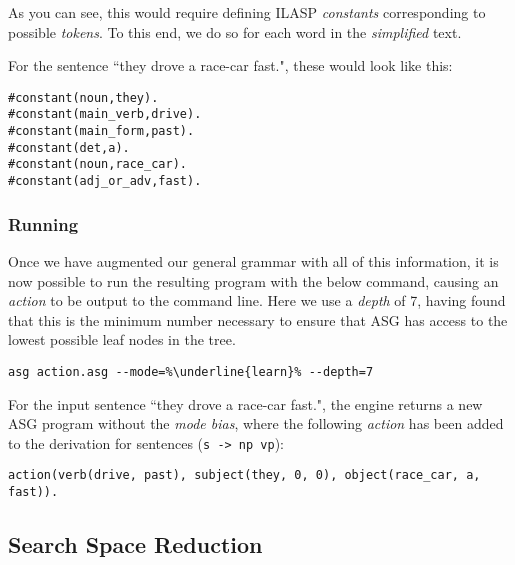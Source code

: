 As you can see, this would require defining ILASP \textit{constants} corresponding to possible \textit{tokens}. To this end, we do so for each word in the \textit{simplified} text.

For the sentence ``they drove a race-car fast.", these would look like this:

\begin{displayquote}
\begin{lstlisting}
#constant(noun,they).
#constant(main_verb,drive).
#constant(main_form,past).
#constant(det,a).
#constant(noun,race_car).
#constant(adj_or_adv,fast).
\end{lstlisting}
\end{displayquote}

\subsubsection{Running}

Once we have augmented our general grammar with all of this information, it is now possible to run the resulting program with the below command, causing an \textit{action} to be output to the command line. Here we use a \textit{depth} of 7, having found that this is the minimum number necessary to ensure that ASG has access to the lowest possible leaf nodes in the tree.

\begin{displayquote}
\begin{lstlisting}[numbers=none, escapechar=\%]
asg action.asg --mode=%\underline{learn}% --depth=7
\end{lstlisting}
\end{displayquote}

For the input sentence ``they drove a race-car fast.", the engine returns a new ASG program without the \textit{mode bias}, where the following \textit{action} has been added to the derivation for sentences (\texttt{s -> np vp}):

\begin{displayquote}
\begin{lstlisting}[numbers=none]
action(verb(drive, past), subject(they, 0, 0), object(race_car, a, fast)).
\end{lstlisting}
\end{displayquote}

\subsection{Search Space Reduction}

